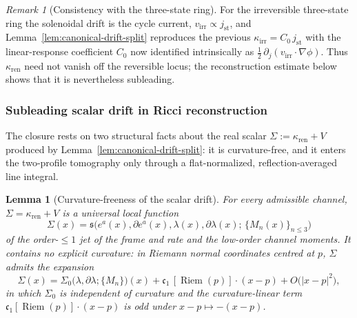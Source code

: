 \documentclass[11pt]{article}
\newtheorem{lemma}[theorem]{Lemma}
\theoremstyle{definition}
\theoremstyle{remark}
\newtheorem{remark}[theorem]{Remark}
\newcommand{\ren}{\mathrm{ren}}
\newcommand{\Riem}{\operatorname{Riem}}
\newcommand{\kren}{\kappa_{\ren}}
\begin{document}
\begin{remark}[Consistency with the three-state ring]
\label{rem:ring}
For the irreversible three-state ring the solenoidal drift is the cycle current,
$v_{\mathrm{irr}}\propto j_{\mathrm{st}}$, and Lemma~\ref{lem:canonical-drift-split} reproduces the
previous $\kappa_{\mathrm{irr}}=C_0\,j_{\mathrm{st}}$ with the linear-response
coefficient $C_0$ now identified intrinsically as
$\tfrac12\,\partial_{j}(v_{\mathrm{irr}}\!\cdot\!\nabla\phi)$.  Thus $\kren$ need
not vanish off the reversible locus; the reconstruction estimate below shows that it is nevertheless subleading.
\end{remark}

\subsubsection{Subleading scalar drift in Ricci reconstruction}
\label{sec:partIII}

The closure rests on two structural facts about the real scalar
$\Sigma:=\kren+V$ produced by Lemma~\ref{lem:canonical-drift-split}: it is curvature-free, and it
enters the two-profile tomography only through a flat-normalized,
reflection-averaged line integral.

\begin{lemma}[Curvature-freeness of the scalar drift]
\label{lem:curvature-free}
For every admissible channel, $\Sigma=\kren+V$ is a universal local function
\[
 \Sigma(x)=\mathfrak s\bigl(e^a(x),\partial e^a(x),\lambda(x),
 \partial\lambda(x);\,\{M_n(x)\}_{n\le3}\bigr)
\]
of the order-$\le1$ jet of the frame and rate and the low-order channel moments.
It contains no explicit curvature: in Riemann normal coordinates centred at $p$,
$\Sigma$ admits the expansion
\[
 \Sigma(x)=\Sigma_0\bigl(\lambda,\partial\lambda;\{M_n\}\bigr)(x)
 +\mathfrak c_1\,[\Riem(p)]\!\cdot\!(x-p)
 +O\bigl(|x-p|^2\bigr),
\]
in which $\Sigma_0$ is independent of curvature and the curvature-linear term
$\mathfrak c_1[\Riem(p)]\!\cdot\!(x-p)$ is odd under $x-p\mapsto-(x-p)$.
\end{lemma}
\end{document}
